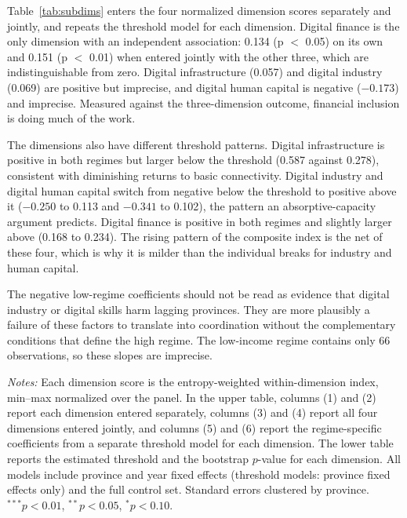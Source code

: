Table~\ref{tab:subdims} enters the four normalized dimension scores separately and jointly, and repeats the threshold model for each dimension. Digital finance is the only dimension with an independent association: 0.134 (p $<$ 0.05) on its own and 0.151 (p $<$ 0.01) when entered jointly with the other three, which are indistinguishable from zero. Digital infrastructure (0.057) and digital industry (0.069) are positive but imprecise, and digital human capital is negative ($-0.173$) and imprecise. Measured against the three-dimension outcome, financial inclusion is doing much of the work.

The dimensions also have different threshold patterns. Digital infrastructure is positive in both regimes but larger below the threshold (0.587 against 0.278), consistent with diminishing returns to basic connectivity. Digital industry and digital human capital switch from negative below the threshold to positive above it ($-0.250$ to 0.113 and $-0.341$ to 0.102), the pattern an absorptive-capacity argument predicts. Digital finance is positive in both regimes and slightly larger above (0.168 to 0.234). The rising pattern of the composite index is the net of these four, which is why it is milder than the individual breaks for industry and human capital.

The negative low-regime coefficients should not be read as evidence that digital industry or digital skills harm lagging provinces. They are more plausibly a failure of these factors to translate into coordination without the complementary conditions that define the high regime. The low-income regime contains only 66 observations, so these slopes are imprecise.

\begin{table}[H]
\caption{Digital factor dimensions: separate, joint, and threshold estimates.}\label{tab:subdims}
\small


\vspace{6pt}


\vspace{3pt}
\parbox{\textwidth}{\footnotesize\textit{Notes:} Each dimension score is the entropy-weighted within-dimension index, min--max normalized over the panel. In the upper table, columns (1) and (2) report each dimension entered separately, columns (3) and (4) report all four dimensions entered jointly, and columns (5) and (6) report the regime-specific coefficients from a separate threshold model for each dimension. The lower table reports the estimated threshold and the bootstrap $p$-value for each dimension. All models include province and year fixed effects (threshold models: province fixed effects only) and the full control set. Standard errors clustered by province. $^{***}p<0.01$, $^{**}p<0.05$, $^{*}p<0.10$.}
\end{table}

